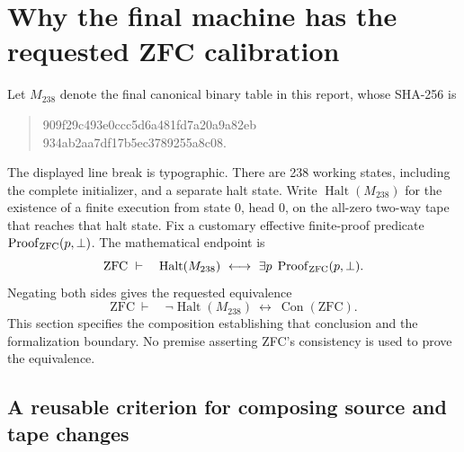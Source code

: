 \section{Why the final machine has the requested ZFC calibration}
\label{sec:logic-review-endpoint}

Let $M_{238}$ denote the final canonical binary table in this report,
whose SHA-256 is
\begin{quote}\small\ttfamily
909f29c493e0ccc5d6a481fd7a20a9a82eb\\
934ab2aa7df17b5ec3789255a8c08.
\end{quote}
The displayed line break is typographic.  There are 238 working states,
including the complete initializer, and a separate halt state.  Write
$\operatorname{Halt}(M_{238})$ for the existence of a finite execution from
state 0, head 0, on the all-zero two-way tape that reaches that halt state.
Fix a customary effective finite-proof predicate
$\operatorname{Proof}_{\rm ZFC}(p,\bot)$.  The mathematical endpoint is
\begin{equation}
 \mathrm{ZFC}\ \vdash\quad
 \operatorname{Halt}(M_{238})
 \ \longleftrightarrow\
 \exists p\;\operatorname{Proof}_{\rm ZFC}(p,\bot).
 \label{eq:review-halting}
\end{equation}
Negating both sides gives the requested equivalence
\[
 \mathrm{ZFC}\ \vdash\quad
 \neg\operatorname{Halt}(M_{238})
 \ \longleftrightarrow\
 \operatorname{Con}(\mathrm{ZFC}).
\]
This section specifies the composition establishing that conclusion and
the formalization boundary.  No premise asserting ZFC's consistency is
used to prove the equivalence.

\subsection{A reusable criterion for composing source and tape changes}

